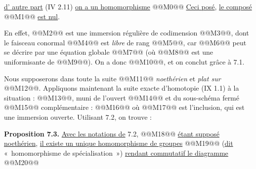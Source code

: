 
\uline{d'%
autre part} (IV 2.11) \uline{on a un homomorphisme}
@@M0@@
\uline{Ceci posé}, \uline{le composé}
@@M1@@
\uline{est nul}.

En effet, @@M2@@ est une immersion régulière de codimension @@M3@@, dont le faisceau conormal @@M4@@ est \emph{libre} de rang @@M5@@, car @@M6@@ peut se décrire par une équation globale @@M7@@ (où @@M8@@ est une uniformisante de @@M9@@). On a donc @@M10@@, et on conclut grâce à 7.1.

Nous supposerons dans toute la suite @@M11@@ \emph{noethérien} et \emph{plat sur} @@M12@@. Appliquons maintenant la suite exacte d'homotopie (IX 1.1) à la situation : @@M13@@, muni de l'ouvert @@M14@@ et du sous-schéma fermé @@M15@@ complémentaire :
@@M16@@
où @@M17@@ est l'inclusion, qui est une immersion ouverte. Utilisant 7.2, on trouve :

\textbf{Proposition 7.3.} \uline{Avec les notations de} 7.2, @@M18@@ \uline{étant supposé noethérien}, \uline{il existe un unique homomorphisme de groupes}
@@M19@@
(\uline{dit} «~homomorphisme de spécialisation~») \uline{rendant commutatif le diagramme}
@@M20@@



\providecommand{\Kalg}{K_{\mathrm{alg}}}
\providecommand{\Gralg}{\operatorname{Gr}_{\mathrm{alg}}}
\providecommand{\Grnum}{\operatorname{Gr}_{\mathrm{num}}}
\providecommand{\Knum}{K_{\mathrm{num}}}
\providecommand{\Cl}{\operatorname{Cl}}
\providecommand{\Ch}{\operatorname{Ch}}
\providecommand{\Nm}{\operatorname{N}}
\providecommand{\colim}{\varinjlim}
\providecommand{\Hens}{\operatorname{Hens}}
\providecommand{\Spec}{\operatorname{Spec}}
\providecommand{\coker}{\operatorname{coker}}


